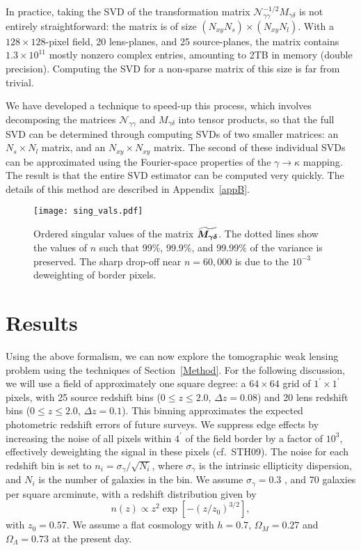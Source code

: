 In practice, taking the SVD of the transformation matrix 
$\mathcal{N}_{\gamma\gamma}^{-1/2}M_{\gamma\delta}$
is not entirely straightforward: the matrix is of size 
$(N_{xy}N_s) \times (N_{xy}N_l)$.
With a $128 \times 128$-pixel field, 20 lens-planes, and 25 source-planes,
the matrix contains $1.3\times 10^{11}$ mostly nonzero complex entries, 
amounting to 2TB in memory (double precision).  
Computing the SVD for a non-sparse matrix of this size is far from trivial.

We have developed a technique to speed-up this process, which involves decomposing
the matrices $\mathcal{N}_{\gamma\gamma}$ and $M_{\gamma\delta}$ into tensor
products, so that the full SVD can be determined through computing SVDs of
two smaller matrices: an $N_s\times N_l$ matrix, 
and an $N_{xy}\times N_{xy}$ matrix.
The second of these individual SVDs can be approximated using the
Fourier-space properties of the $\gamma\to\kappa$ mapping.  The result is
that the entire SVD estimator can be computed very quickly.  The details
of this method are described in Appendix~\ref{appB}.

\begin{figure*}[t] 
 \centering
 \texttt{[image: sing\_vals.pdf]}
 \caption[Ordered singular values]{
   Ordered singular values of the matrix
   $\boldsymbol{\widetilde{M_{\gamma\delta}}}$.
   The dotted lines show the values of $n$ 
   such that 99\%, 99.9\%, and 99.99\% of the variance is preserved.
   The sharp drop-off near $n=60,000$ is due to the $10^{-3}$ 
   deweighting of border pixels.
   \label{fig_sing_vals}}
\end{figure*}

\section{Results}
\label{Results}
\label{Parameters}
Using the above formalism, we can now explore the
tomographic weak lensing problem using the 
techniques of Section~\ref{Method}.
For the following discussion, we will use a field of approximately 
one square degree: a $64 \times 64$ grid of
$1^\prime \times 1^\prime$ pixels, with 25 source redshift
bins ($0\le z\le 2.0$, $\Delta z = 0.08$) and 20 lens redshift bins
($0\le z\le 2.0$, $\Delta z = 0.1$).  This binning approximates the 
expected photometric redshift errors of future surveys.
We suppress edge effects by increasing
the noise of all pixels within $4^\prime$ of the field border
by a factor of $10^3$, effectively
deweighting the signal in these pixels (cf.\ STH09).  The noise
for each redshift bin is set to $n_i = \sigma_\gamma/\sqrt{N_i}$, where 
$\sigma_\gamma$ is the intrinsic ellipticity dispersion, and
$N_i$ is the number of galaxies in the bin.  We assume $\sigma_\gamma = 0.3$
\citep[based on the Hubble Deep Field image][]{Mellier99},
and 70 galaxies per square arcminute, with a redshift distribution given by
\begin{equation}
  \label{gal_z_dist}
  n(z) \propto z^2\exp{\left[-(z/z_0)^{3/2}\right]},
\end{equation}
with $z_0 = 0.57$.  We assume a flat cosmology with 
$h=0.7$, $\Omega_M = 0.27$  and $\Omega_\Lambda = 0.73$ at the present day.

